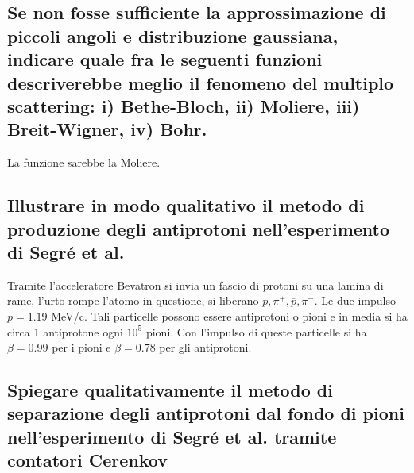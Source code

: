 \subsection[\hspace{1mm} ]{Se non fosse sufficiente la approssimazione di piccoli angoli e distribuzione gaussiana, indicare quale fra le seguenti funzioni descriverebbe meglio il fenomeno del multiplo scattering: i) Bethe-Bloch, ii) Moliere, iii) Breit-Wigner, iv) Bohr.
}\label{sec:4.a.31}
La funzione sarebbe la Moliere.

\subsection[\hspace{1mm} ]{Illustrare in modo qualitativo il metodo di produzione degli antiprotoni nell’esperimento di Segré et al.
}\label{sec:4.a.32}
Tramite l'acceleratore Bevatron si invia un fascio di protoni su una lamina di rame, l'urto rompe l'atomo in questione, si liberano $p, \pi^+, \overline{p}, \pi^-$. Le due  impulso $p= 1.19$ MeV/c.
Tali particelle possono essere antiprotoni o pioni e in media si ha circa 1 antiprotone ogni $10^{5}$ pioni. Con l'impulso di queste particelle si ha $\beta = 0.99$ per i pioni e $\beta=0.78$ per gli antiprotoni.

\subsection[\hspace{1mm} ]{Spiegare qualitativamente il metodo di separazione degli antiprotoni dal fondo di pioni nell’esperimento di Segré et al. tramite contatori Cerenkov
}\label{sec:4.a.33}

